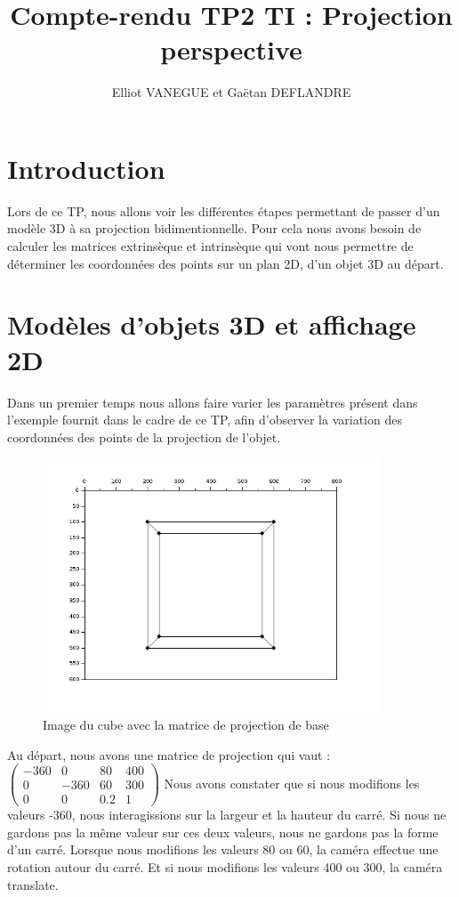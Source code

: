 \documentclass[a4paper,11pt]{article}
\title{Compte-rendu TP2 TI : Projection perspective}
\author{Elliot VANEGUE et Gaëtan DEFLANDRE}
\begin{document}


  \maketitle
  
  \mbox{}
  \newpage
  \clearpage
  
  \section*{Introduction}
  Lors de ce TP, nous allons voir les différentes étapes permettant de passer d'un
  modèle 3D à sa projection bidimentionnelle. Pour cela nous avons besoin de calculer les matrices 
  extrinsèque et intrinsèque qui vont nous permettre de déterminer les coordonnées des points
  sur un plan 2D, d'un objet 3D au départ.
  
  \section{Modèles d'objets 3D et affichage 2D}
  Dans un premier temps nous allons faire varier les paramètres présent dans l'exemple fournit
  dans le cadre de ce TP, afin d'observer la variation des coordonnées des points de la projection de l'objet.\\
  
  \begin{figure}[H]
    \center
    \includegraphics[width=10cm]{Projection1.png}
    \caption{Image du cube avec la matrice de projection de base}
  \end{figure}

  
  Au départ, nous avons une matrice de projection qui vaut : 
  $\begin{pmatrix}
   -360 & 0 & 80 & 400 \\
   0 & -360 & 60 & 300 \\
   0 & 0 & 0.2 & 1
  \end{pmatrix}$
  Nous avons constater que si nous modifions les valeurs -360, nous interagissions sur la largeur
  et la hauteur du carré. Si nous ne gardons pas la même valeur sur ces deux valeurs, nous ne 
  gardons pas la forme d'un carré. Lorsque nous modifions les valeurs 80 ou 60, la caméra effectue une rotation
  autour du carré. Et si nous modifions les valeurs 400 ou 300, la caméra translate.\\
  
\end{document}
